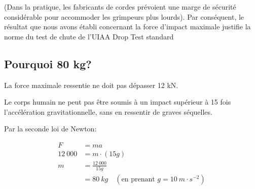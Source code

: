\documentclass[a4paper,10pt,french]{scrartcl}
\begin{document}
(Dans la pratique, les fabricants de cordes pr\'evoient une marge de s\'ecurit\'e consid\'erable pour accommoder les grimpeurs plus lourds). Par cons\'equent, le r\'esultat que nous avons \'etabli concernant la force d'impact maximale justifie la norme du test de chute de l'UIAA Drop Test standard

\subsection{Pourquoi 80 kg?}

La force maximale ressentie ne doit pas d\'epasser 12 kN.

Le corps humain ne peut pas \^etre soumis \`a un impact sup\'erieur \`a 15 fois l'acc\'el\'eration gravitationnelle, sans en ressentir de graves s\'equelles.

Par la seconde loi de Newton:

\[
\begin{aligned}
F &= ma \\
12\ 000 &= m\cdot (15g) \\
m &= \frac{12\ 000}{15g} \\
&= 80\ kg \quad (\text{en prenant } g=10 \ m\cdot s^{-2})
\end{aligned}
\]



\end{document}
